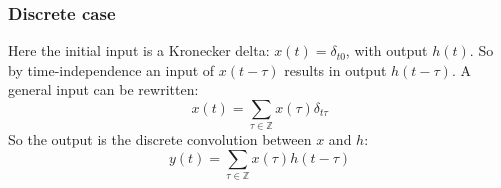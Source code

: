\documentclass[12pt, a4paper]{article}
\numberwithin{equation}{section}
\begin{document}
\subsubsection{Discrete case}
Here the initial input is a Kronecker delta: $x(t)=\delta_{t0}$, with output $h(t)$. So by time-independence an input of $x(t-\tau)$ results in output $h(t-\tau)$. A general input can be rewritten:
\begin{equation}
x(t)=\sum_{\tau\in\mathbb{Z}}x(\tau)\delta_{t\tau}
\end{equation}
So the output is the discrete convolution between $x$ and $h$:
\begin{equation}
y(t)=\sum_{\tau\in\mathbb{Z}}x(\tau)h(t-\tau)
\end{equation}
\end{document}
